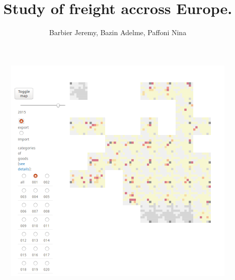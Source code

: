 \documentclass{vgtc}
\title{Study of freight accross Europe.}
\author{Barbier Jeremy, Bazin Adelme, Paffoni Nina}
\begin{document}
\maketitle

\begin{figure}[H]
\center
\includegraphics[scale=0.2]{OurMap.png}
\end{figure}
\end{document}
